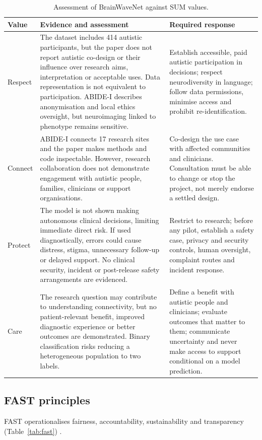 \documentclass[11pt,a4paper]{article}
\let\cite\parencite
\begin{document}
\begin{table}[H]
\centering
\caption{Assessment of BrainWaveNet against SUM values.}
\label{tab:sum}
\small
\begin{tabularx}{\textwidth}{p{2.1cm}Y Y}
\toprule
\textbf{Value} & \textbf{Evidence and assessment} & \textbf{Required response}\\
\midrule
Respect & The dataset includes 414 autistic participants, but the paper does not report autistic co-design or their influence over research aims, interpretation or acceptable uses. Data representation is not equivalent to participation. ABIDE-I describes anonymisation and local ethics oversight, but neuroimaging linked to phenotype remains sensitive. & Establish accessible, paid autistic participation in decisions; respect neurodiversity in language; follow data permissions, minimise access and prohibit re-identification.\\
Connect & ABIDE-I connects 17 research sites and the paper makes methods and code inspectable. However, research collaboration does not demonstrate engagement with autistic people, families, clinicians or support organisations. & Co-design the use case with affected communities and clinicians. Consultation must be able to change or stop the project, not merely endorse a settled design.\\
Protect & The model is not shown making autonomous clinical decisions, limiting immediate direct risk. If used diagnostically, errors could cause distress, stigma, unnecessary follow-up or delayed support. No clinical security, incident or post-release safety arrangements are evidenced. & Restrict to research; before any pilot, establish a safety case, privacy and security controls, human oversight, complaint routes and incident response.\\
Care & The research question may contribute to understanding connectivity, but no patient-relevant benefit, improved diagnostic experience or better outcomes are demonstrated. Binary classification risks reducing a heterogeneous population to two labels. & Define a benefit with autistic people and clinicians; evaluate outcomes that matter to them; communicate uncertainty and never make access to support conditional on a model prediction.\\
\bottomrule
\end{tabularx}
\end{table}

\subsection{FAST principles}
FAST operationalises fairness, accountability, sustainability and transparency (Table~\ref{tab:fast}) \cite{leslie2019}.
\end{document}
